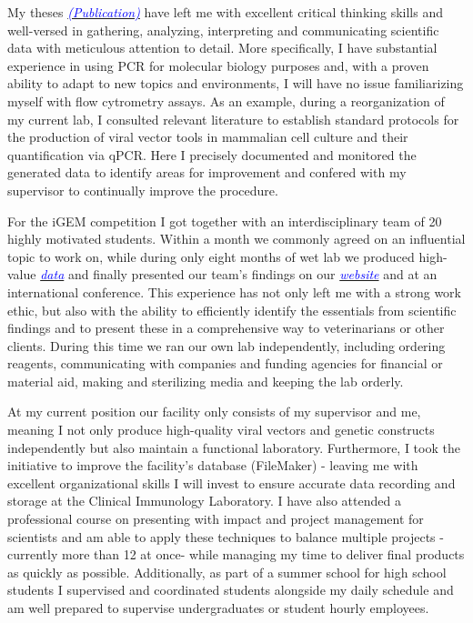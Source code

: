\documentclass[11pt,a4paper,sans]{moderncv}
\begin{document}
\begin{spacing}{1.1}
My theses {\href{https://www.ncbi.nlm.nih.gov/pubmed/29517395}{\textcolor{blue}{{\textit{(Publication)}}}}} have left me with excellent critical thinking skills and well-versed in gathering, analyzing, interpreting and communicating scientific data with meticulous attention to detail. 
More specifically, I have substantial experience in using PCR for molecular biology purposes and, with a proven ability to adapt to new topics and environments, I will have no issue familiarizing myself with flow cytrometry assays. 
As an example, during a reorganization of my current lab, I consulted relevant literature to establish standard protocols for the production of viral vector tools in mammalian cell culture and their quantification via qPCR. 
Here I precisely documented and monitored the generated data to identify areas for improvement and confered with my supervisor to continually improve the procedure. \par%
For the iGEM competition I got together with an interdisciplinary team of 20 highly motivated students. 
Within a month we commonly agreed on an influential topic to work on, while during only eight months of wet lab we produced high-value  {\href{https://www.ncbi.nlm.nih.gov/pubmed/29803867}{\textcolor{blue}{\textit{data}}}} and finally presented our team's findings on our {\href{http://2015.igem.org/Team:Freiburg}{\textcolor{blue}{\textit{website}}}} and at an international conference. 
This experience has not only left me with a strong work ethic, but also with the ability to efficiently identify the essentials from scientific findings and to present these in a comprehensive way to veterinarians or other clients. 
During this time we ran our own lab independently, including ordering reagents, communicating with companies and funding agencies for financial or material aid, making and sterilizing media and keeping the lab orderly. \par 
At my current position our facility only consists of my supervisor and me, meaning I not only produce high-quality viral vectors and genetic constructs independently but also maintain a functional laboratory. 
Furthermore, I took the initiative to improve the facility's database (FileMaker) - leaving me with excellent organizational skills I will invest to ensure accurate data recording and storage at the Clinical Immunology Laboratory. 
I have also attended a professional course on presenting with impact and project management for scientists and am able to apply these techniques to balance multiple projects - currently more than 12 at once- while managing my time to deliver final products as quickly as possible. 
Additionally, as part of a summer school for high school students I supervised and coordinated students alongside my daily schedule and am well prepared to supervise undergraduates or student hourly employees. \par%



\end{spacing}
\end{document}

